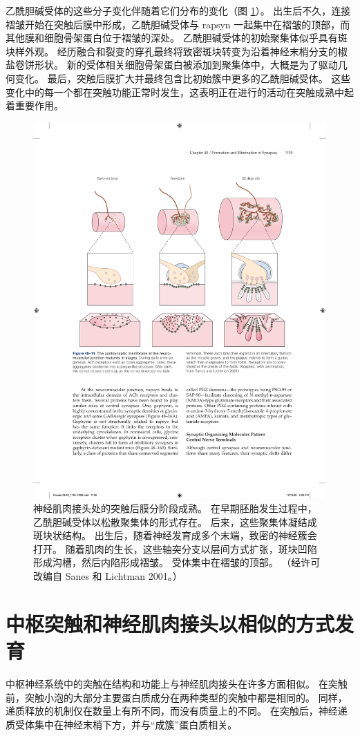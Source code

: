 乙酰胆碱受体的这些分子变化伴随着它们分布的变化（图 \ref{fig:48_14}）。 
出生后不久，连接褶皱开始在突触后膜中形成，乙酰胆碱受体与 rapsyn 一起集中在褶皱的顶部，而其他膜和细胞骨架蛋白位于褶皱的深处。 乙酰胆碱受体的初始聚集体似乎具有斑块样外观。 经历融合和裂变的穿孔最终将致密斑块转变为沿着神经末梢分支的椒盐卷饼形状。 新的受体相关细胞骨架蛋白被添加到聚集体中，大概是为了驱动几何变化。 最后，突触后膜扩大并最终包含比初始簇中更多的乙酰胆碱受体。 这些变化中的每一个都在突触功能正常时发生，这表明正在进行的活动在突触成熟中起着重要作用。

\begin{figure}[htbp]
	\centering
	\includegraphics[width=0.9\linewidth]{chap48/fig_48_14}
	\caption{神经肌肉接头处的突触后膜分阶段成熟。 在早期胚胎发生过程中，乙酰胆碱受体以松散聚集体的形式存在。 后来，这些聚集体凝结成斑块状结构。 出生后，随着神经发育成多个末端，致密的神经簇会打开。 随着肌肉的生长，这些轴突分支以层间方式扩张，斑块凹陷形成沟槽，然后内陷形成褶皱。 受体集中在褶皱的顶部。 （经许可改编自 Sanes 和 Lichtman 2001。）}
	\label{fig:48_14}
\end{figure}


\section{中枢突触和神经肌肉接头以相似的方式发育}
中枢神经系统中的突触在结构和功能上与神经肌肉接头在许多方面相似。 在突触前，突触小泡的大部分主要蛋白质成分在两种类型的突触中都是相同的。 同样，递质释放的机制仅在数量上有所不同，而没有质量上的不同。 在突触后，神经递质受体集中在神经末梢下方，并与“成簇”蛋白质相关。

